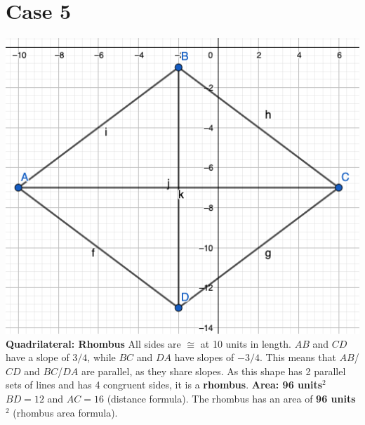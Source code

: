 \documentclass{article}
\begin{document}
	\section*{Case 5}
	\includegraphics[scale=0.38]{pics/Case5} \newline
	\textbf{Quadrilateral: Rhombus} \newline
	All sides are $\cong$ at 10 units in length. \newline
	$AB$ and $CD$ have a slope of $3/4$, while $BC$ and $DA$ have slopes of $-3/4$. \newline
	This means that $AB$/$CD$ and $BC$/$DA$ are parallel, as they share slopes. \newline
	As this shape has 2 parallel sets of lines and has 4 congruent sides, it is a \textbf{rhombus}. \newline \newline
	\textbf{Area: 96 units$^2$} \newline
	$BD = 12$ and $AC = 16$ (distance formula). \newline
	The rhombus has an area of \textbf{96 units$^2$} (rhombus area formula).
	
\end{document}
